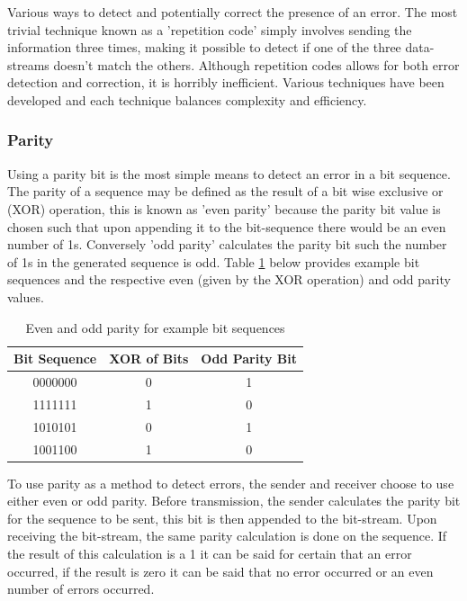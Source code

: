 Various ways to detect and potentially correct the presence of an error. The most trivial technique known as a 'repetition code' simply involves sending the information three times, making it possible to detect if one of the three data-streams doesn't match the others. Although repetition codes allows for both error detection and correction, it is horribly inefficient. Various techniques have been developed and each technique balances complexity and efficiency.

\subsubsection{Parity}
Using a parity bit is the most simple means to detect an error in a bit sequence. The parity of a sequence may be defined as the result of a bit wise exclusive or (XOR) operation, this is known as 'even parity' because the parity bit value is chosen such that upon appending it to the bit-sequence there would be an even number of 1s. Conversely 'odd parity' calculates the parity bit such the number of 1s in the generated sequence is odd. Table \ref{tbl:party_examples} below provides example bit sequences and the respective even (given by the XOR operation) and odd parity values.

\begin{table}[H]
	\centering
	\begin{tabular}{ccc}
		\hline
		\multicolumn{1}{l}{\textbf{Bit Sequence}} & \textbf{XOR of Bits} & \multicolumn{1}{l}{\textbf{Odd Parity Bit}} \\ \hline
		0000000 & 0 & 1 \\ \hline
		1111111 & 1 & 0 \\ \hline
		1010101 & 0 & 1 \\ \hline
		1001100 & 1 & 0 \\ \hline
	\end{tabular}
	\caption{Even and odd parity for example bit sequences}
	\label{tbl:party_examples}
\end{table}

 To use parity as a method to detect errors, the sender and receiver choose to use either even or odd parity. Before transmission, the sender calculates the parity bit for the sequence to be sent, this bit is then appended to the bit-stream. Upon receiving the bit-stream, the same parity calculation is done on the sequence. If the result of this calculation is a 1 it can be said for certain that an error occurred, if the result is zero it can be said that no error occurred or an even number of errors occurred.

